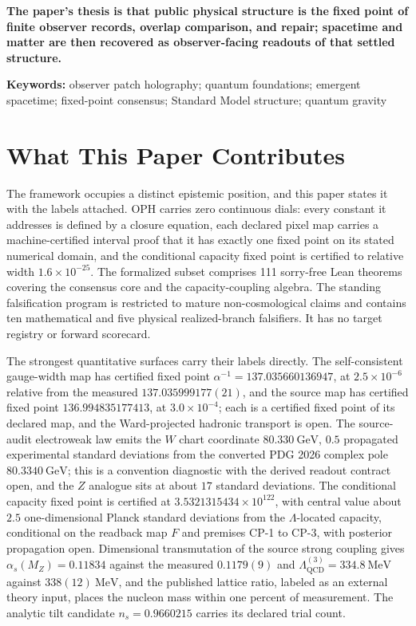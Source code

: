 \documentclass[11pt]{article}
\begin{document}
\begin{center}
\begin{minipage}{0.88\textwidth}
\centering
\bfseries
The paper's thesis is that public physical structure is the fixed point of
finite observer records, overlap comparison, and repair; spacetime and matter
are then recovered as observer-facing readouts of that settled structure.
\end{minipage}
\end{center}

\noindent\textbf{Keywords:} observer patch holography; quantum foundations; emergent spacetime;
fixed-point consensus; Standard Model structure; quantum gravity

\section*{What This Paper Contributes}

The framework occupies a distinct epistemic position, and this paper states it with the labels
attached. OPH carries zero continuous dials: every constant it addresses is defined by a closure
equation, each declared pixel map carries a machine-certified interval proof that it has exactly
one fixed point on its stated numerical domain, and the conditional capacity fixed point is
certified to relative width \(1.6\times10^{-25}\). The formalized subset comprises 111 sorry-free
Lean theorems covering the consensus core and the capacity-coupling algebra. The standing
falsification program is restricted to mature non-cosmological claims and contains ten
mathematical and five physical realized-branch falsifiers. It has no target registry or
forward scorecard.

The strongest quantitative surfaces carry their labels directly. The self-consistent gauge-width
map has certified fixed point \(\alpha^{-1}=137.035660136947\), at \(2.5\times10^{-6}\) relative
from the measured \(137.035999177(21)\), and the source map has certified fixed point
\(136.994835177413\), at \(3.0\times10^{-4}\); each is a certified fixed point of its declared
map, and the Ward-projected hadronic transport is open. The source-audit electroweak law emits
the \(W\) chart coordinate \(80.330~\mathrm{GeV}\), \(0.5\) propagated experimental standard
deviations from the converted PDG 2026 complex pole \(80.3340~\mathrm{GeV}\); this is a
convention diagnostic with the derived readout contract open, and the \(Z\) analogue sits at
about \(17\) standard deviations. The conditional capacity fixed point is certified at
\(3.5321315434\times10^{122}\), with central value about \(2.5\) one-dimensional Planck standard
deviations from the \(\Lambda\)-located capacity, conditional on the readback map \(F\) and
premises CP-1 to CP-3, with posterior propagation open. Dimensional transmutation of the source
strong coupling gives \(\alpha_s(M_Z)=0.11834\) against the measured \(0.1179(9)\) and
\(\Lambda_{\mathrm{QCD}}^{(3)}=334.8~\mathrm{MeV}\) against \(338(12)~\mathrm{MeV}\), and the
published lattice ratio, labeled as an external theory input, places the nucleon mass within one
percent of measurement. The analytic tilt candidate \(n_s=0.9660215\) carries its declared
trial count.
\end{document}
